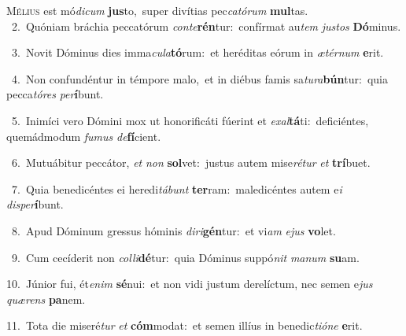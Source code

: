 \lettrine{\initial\textcolor{\initialcolor}{M}}{élius} est mó\-\textit{di}\-\textit{cum} \textbf{jus}\-to,~\star super divítias pec\-\textit{ca}\-\textit{tó}\textit{rum} \textbf{mul}\-tas.\\
{\numbfont\textcolor{\numbcolor}{~2.}}~Quóniam bráchia peccatórum \textit{con}\-\textit{te}\textbf{rén}tur:~\star confírmat au\textit{tem} \textit{jus}\-\textit{tos} \textbf{Dó}\-minus.\par
{\numbfont\textcolor{\numbcolor}{~3.}}~Novit Dóminus dies imma\-\textit{cu}\-\textit{la}\textbf{tó}rum:~\star et heréditas eórum in \textit{æ}\-\textit{tér}\textit{num} \textbf{e}\-rit.\par
{\numbfont\textcolor{\numbcolor}{~4.}}~Non confundéntur in témpore malo,~\dagger et in diébus famis sa\-\textit{tu}\-\textit{ra}\textbf{bún}tur:~\star quia pecca\-\textit{tó}\-\textit{res} \textit{per}\-\textbf{í}bunt.\par
{\numbfont\textcolor{\numbcolor}{~5.}}~Inimíci vero Dómini mox ut honorificáti fúerint et \textit{ex}\-\textit{al}\textbf{tá}ti:~\star deficiéntes, quemádmodum \textit{fu}\-\textit{mus} \textit{de}\-\textbf{fí}cient.\par
{\numbfont\textcolor{\numbcolor}{~6.}}~Mutuábitur peccátor, \textit{et} \textit{non} \textbf{sol}\-vet:~\star justus autem mise\-\textit{ré}\-\textit{tur} \textit{et} \textbf{trí}\-buet.\par
{\numbfont\textcolor{\numbcolor}{~7.}}~Quia benedicéntes ei heredi\-\textit{tá}\-\textit{bunt} \textbf{ter}\-ram:~\star maledicéntes autem e\textit{i} \textit{dis}\-\textit{per}\textbf{í}bunt.\par
{\numbfont\textcolor{\numbcolor}{~8.}}~Apud Dóminum gressus hóminis \textit{di}\-\textit{ri}\textbf{gén}tur:~\star et vi\textit{am} \textit{e}\-\textit{jus} \textbf{vo}\-let.\par
{\numbfont\textcolor{\numbcolor}{~9.}}~Cum cecíderit non \textit{col}\-\textit{li}\textbf{dé}tur:~\star quia Dóminus suppó\textit{nit} \textit{ma}\-\textit{num} \textbf{su}\-am.\par
{\numbfont\textcolor{\numbcolor}{10.}}~Júnior fui, ét\-\textit{e}\-\textit{nim} \textbf{sé}\-nui:~\star et non vidi justum derelíctum, nec semen e\textit{jus} \textit{quæ}\-\textit{rens} \textbf{pa}\-nem.\par
{\numbfont\textcolor{\numbcolor}{11.}}~Tota die miseré\textit{tur} \textit{et} \textbf{cóm}\-modat:~\star et semen illíus in benedic\-\textit{ti}\-\textit{ó}\textit{ne} \textbf{e}\-rit.\par
